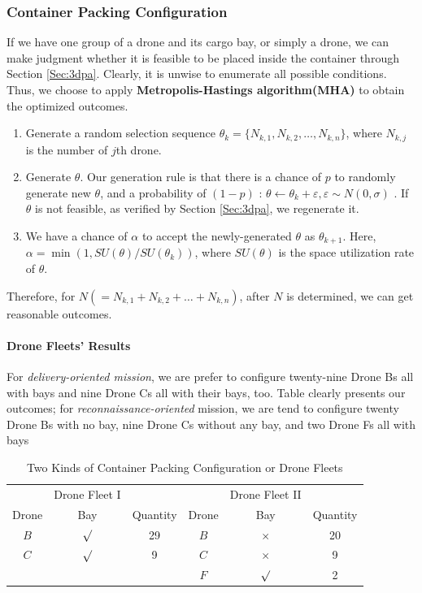\documentclass{mcmthesis}
\begin{document}
\subsubsection{Container Packing Configuration}\label{Subsub:cont}

If we have one group of a drone and its cargo bay, or simply a drone, we can make judgment whether it is feasible to be placed inside the container through Section \ref{Sec:3dpa}. Clearly, it is unwise to enumerate all possible conditions. Thus, we choose to apply \textbf{Metropolis-Hastings algorithm(MHA)} \cite{MetropolisHastingsAlgorithm} to obtain the optimized outcomes.

\begin{enumerate}[STEP 1]
    \item Generate a random selection sequence $\theta_k=\{N_{k,1},N_{k,2},\dots,N_{k,n}\}$, where $N_{k,j}$ is the number of $j$th drone. 
    \item Generate $\theta$. Our generation rule is that there is a chance of $p$ to randomly generate new $\theta$, and a probability of $(1-p)$ : $\theta\leftarrow \theta_k + \varepsilon, \varepsilon \sim N(0,\sigma)$ . If $\theta$ is not feasible, as verified by Section \ref{Sec:3dpa}, we regenerate it.
    \item We have a chance of $\alpha$ to accept the newly-generated $\theta$ as $\theta_{k+1}$. Here, $\alpha=\min(1, SU(\theta)/SU(\theta_{k}))$, where $SU(\theta)$ is the space utilization rate of $\theta$.
\end{enumerate}

Therefore, for $N(=N_{k,1}+N_{k,2}+\dots+N_{k,n})$, after $N$ is determined, we can get reasonable outcomes. 

\paragraph{Drone Fleets' Results}For \emph{delivery-oriented mission}, we are prefer to configure twenty-nine Drone Bs all with bays and nine Drone Cs all with their bays, too. Table \label{Tab:twok} clearly presents our outcomes; for \emph{reconnaissance-oriented} mission, we are tend to configure twenty Drone Bs with no bay, nine Drone Cs without any bay, and two Drone Fs all with bays

\begin{table}[h]
    \centering
    \caption{Two Kinds of Container Packing Configuration or Drone Fleets}
    \label{Tab:twok}
    \begin{tabular}{c c c|c c c}
\hline
         \, & Drone Fleet I & \, & \,& Drone Fleet II & \,\\
    	Drone & Bay & Quantity & Drone & Bay & Quantity\\
\hline
	$B$ & $\surd$ & 29 & $B$ & $\times$ & 20\\
	$C$ & $\surd$ &  9 & $C$ & $\times$ &  9\\
	 \, &    \,   &  \,& $F$ & $\surd$  &  2\\
\hline
    \end{tabular}
\end{table}
\end{document}
